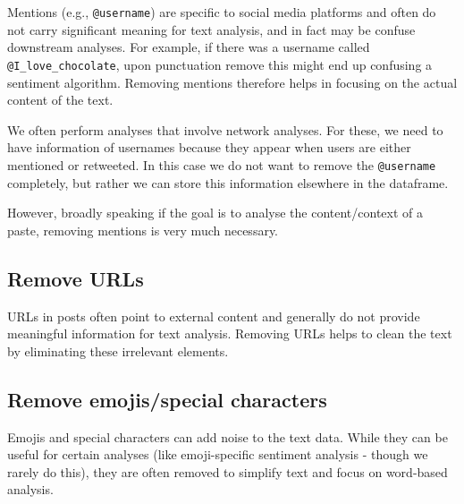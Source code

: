 \documentclass[
  letterpaper,
  DIV=11,
  numbers=noendperiod]{scrreprt}
\begin{document}
Mentions (e.g., \texttt{@username}) are specific to social media
platforms and often do not carry significant meaning for text analysis,
and in fact may be confuse downstream analyses. For example, if there
was a username called \texttt{@I\_love\_chocolate}, upon punctuation
remove this might end up confusing a sentiment algorithm. Removing
mentions therefore helps in focusing on the actual content of the text.

\begin{tcolorbox}[enhanced jigsaw, opacitybacktitle=0.6, breakable, title=\textcolor{quarto-callout-tip-color}{\faLightbulb}\hspace{0.5em}{Retaining mentions, sometimes}, arc=.35mm, colframe=quarto-callout-tip-color-frame, colbacktitle=quarto-callout-tip-color!10!white, left=2mm, bottomrule=.15mm, opacityback=0, toprule=.15mm, bottomtitle=1mm, toptitle=1mm, titlerule=0mm, leftrule=.75mm, colback=white, rightrule=.15mm, coltitle=black]

We often perform analyses that involve network analyses. For these, we
need to have information of usernames because they appear when users are
either mentioned or retweeted. In this case we do not want to remove the
\texttt{@username} completely, but rather we can store this information
elsewhere in the dataframe.

However, broadly speaking if the goal is to analyse the content/context
of a paste, removing mentions is very much necessary.

\end{tcolorbox}

\subsection{Remove URLs}\label{remove-urls}

URLs in posts often point to external content and generally do not
provide meaningful information for text analysis. Removing URLs helps to
clean the text by eliminating these irrelevant elements.

\subsection{Remove emojis/special
characters}\label{remove-emojisspecial-characters}

Emojis and special characters can add noise to the text data. While they
can be useful for certain analyses (like emoji-specific sentiment
analysis - though we rarely do this), they are often removed to simplify
text and focus on word-based analysis.
\end{document}
